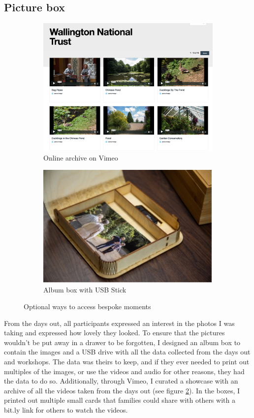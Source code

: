 \subsection{Picture box}
\label{PictureBox}

\begin{figure}[htp]
\centering
\begin{subfigure}{.5\textwidth}
  \centering
  \includegraphics[width=.8\linewidth]{Images/ChapterFour/VimeoWebsite.png}
  \caption{Online archive on Vimeo}
  \label{fig:onlineArchive}
\end{subfigure}%
\begin{subfigure}{.5\textwidth}
  \centering
  \includegraphics[width=.8\linewidth]{Images/ChapterFour/InsidePhotoAlbum.jpg}
  \caption{Album box with USB Stick}
  \label{fig:AlbumBox}
\end{subfigure}
\caption{Optional ways to access bespoke moments}
\label{fig:OptionalMoments}
\end{figure}

From the days out, all participants expressed an interest in the photos I was taking and expressed how lovely they looked. To ensure that the pictures wouldn't be put away in a drawer to be forgotten, I designed an album box to contain the images and a USB drive with all the data collected from the days out and workshops. The data was theirs to keep, and if they ever needed to print out multiples of the images, or use the videos and audio for other reasons, they had the data to do so. Additionally, through Vimeo, I curated a showcase with an archive of all the videos taken from the days out (see figure \ref{fig:AlbumBox}). In the boxes, I printed out multiple small cards that families could share with others with a bit.ly link for others to watch the videos. 

